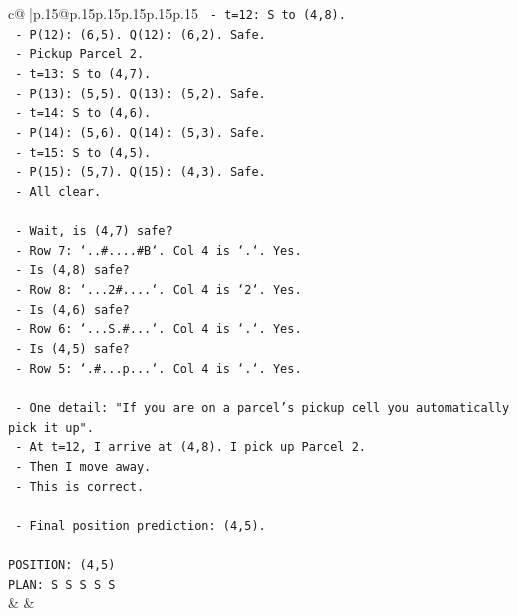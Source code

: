 \documentclass{article}
\begin{document}
{\begin{supertabular}{c@{$\;$}|p{.15\linewidth}@{}p{.15\linewidth}p{.15\linewidth}p{.15\linewidth}p{.15\linewidth}p{.15\linewidth}}
{{{\texttt{  {-} t=12: S to (4,8).} \\
\texttt{    {-} P(12): (6,5). Q(12): (6,2). Safe.} \\
\texttt{    {-} Pickup Parcel 2.} \\
\texttt{  {-} t=13: S to (4,7).} \\
\texttt{    {-} P(13): (5,5). Q(13): (5,2). Safe.} \\
\texttt{  {-} t=14: S to (4,6).} \\
\texttt{    {-} P(14): (5,6). Q(14): (5,3). Safe.} \\
\texttt{  {-} t=15: S to (4,5).} \\
\texttt{    {-} P(15): (5,7). Q(15): (4,3). Safe.} \\
\texttt{  {-} All clear.} \\
\\ 
\texttt{  {-} Wait, is (4,7) safe?} \\
\texttt{  {-} Row 7: `..\#....\#B`. Col 4 is `.`. Yes.} \\
\texttt{  {-} Is (4,8) safe?} \\
\texttt{  {-} Row 8: `...2\#....`. Col 4 is `2`. Yes.} \\
\texttt{  {-} Is (4,6) safe?} \\
\texttt{  {-} Row 6: `...S.\#...`. Col 4 is `.`. Yes.} \\
\texttt{  {-} Is (4,5) safe?} \\
\texttt{  {-} Row 5: `.\#...p...`. Col 4 is `.`. Yes.} \\
\\ 
\texttt{  {-} One detail: "If you are on a parcel's pickup cell you automatically pick it up".} \\
\texttt{  {-} At t=12, I arrive at (4,8). I pick up Parcel 2.} \\
\texttt{  {-} Then I move away.} \\
\texttt{  {-} This is correct.} \\
\\ 
\texttt{  {-} Final position prediction: (4,5).} \\
\\ 
\texttt{POSITION: (4,5)} \\
\texttt{PLAN: S S S S S} \\
            }
        }
    }
    & & \\ \\


\end{supertabular}}
\end{document}
